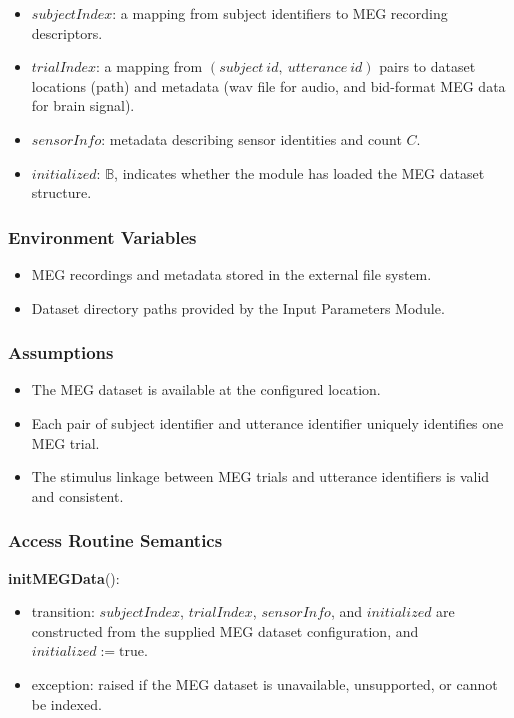 \documentclass[12pt, titlepage]{article}
\begin{document}
\begin{itemize}
    \item $subjectIndex$: a mapping from subject identifiers to MEG recording descriptors.
    \item $trialIndex$: a mapping from $(subject\ id,\ utterance\ id)$ pairs to dataset locations (path) and metadata (wav file for audio, and bid-format MEG data for brain signal).
    \item $sensorInfo$: metadata describing sensor identities and count $C$.
    \item $initialized$: $\mathbb{B}$, indicates whether the module has loaded the MEG dataset structure.
\end{itemize}

\subsubsection{Environment Variables}

\begin{itemize}
    \item MEG recordings and metadata stored in the external file system.
    \item Dataset directory paths provided by the Input Parameters Module.
\end{itemize}

\subsubsection{Assumptions}

\begin{itemize}
    \item The MEG dataset is available at the configured location.
    \item Each pair of subject identifier and utterance identifier uniquely identifies one MEG trial.
    \item The stimulus linkage between MEG trials and utterance identifiers is valid and consistent.
\end{itemize}

\subsubsection{Access Routine Semantics}

\noindent \textbf{initMEGData}():
\begin{itemize}
    \item transition: $subjectIndex$, $trialIndex$, $sensorInfo$, and $initialized$ are constructed from the supplied MEG dataset configuration, and $initialized := \mathrm{true}$.
    \item exception: raised if the MEG dataset is unavailable, unsupported, or cannot be indexed.
\end{itemize}
\end{document}
